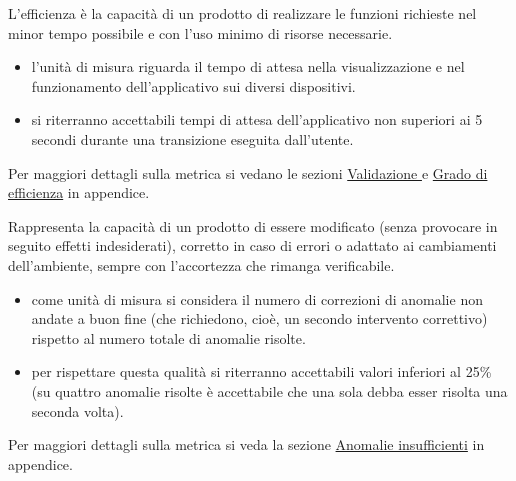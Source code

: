 \documentclass[a4paper, titlepage]{article}
\begin{document}
L'efficienza è la capacità di un prodotto  di realizzare le funzioni richieste nel minor tempo possibile e con l'uso minimo di risorse necessarie.
\begin{itemize}
\item {} l'unità di misura riguarda il tempo di attesa nella visualizzazione e nel funzionamento dell'applicativo sui diversi dispositivi.
\item {} si riterranno accettabili tempi di attesa dell'applicativo non superiori ai 5 secondi durante una transizione eseguita dall'utente.
\end{itemize}
Per maggiori dettagli sulla metrica si vedano le sezioni \hyperref[par:\gl{web}]{Validazione } e \hyperref[par:greff]{Grado di efficienza} in appendice.

Rappresenta la capacità di un prodotto  di essere modificato (senza provocare in seguito effetti indesiderati), corretto in caso di errori o adattato ai cambiamenti dell'ambiente, sempre con l'accortezza che rimanga verificabile.
\begin{itemize}
\item {} come unità di misura si considera il numero di correzioni di anomalie non andate a buon fine (che richiedono, cioè, un secondo intervento correttivo) rispetto al numero totale di anomalie risolte.
\item {} per rispettare questa qualità si riterranno accettabili valori inferiori al 25\% (su quattro anomalie risolte è accettabile che una sola debba esser risolta una seconda volta).
\end{itemize}
Per maggiori dettagli sulla metrica si veda la sezione \hyperref[par:anins]{Anomalie insufficienti} in appendice.
\end{document}
